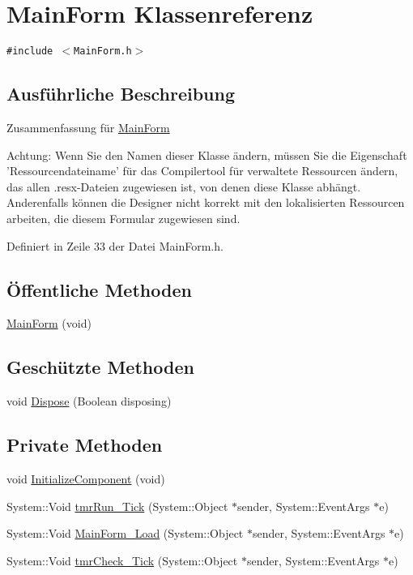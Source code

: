 \hypertarget{classQbeNDI_1_1MainForm}{
\section{Main\-Form Klassenreferenz}
\label{classQbeNDI_1_1MainForm}
}
{\tt \#include $<$Main\-Form.h$>$}



\subsection{Ausf\"{u}hrliche Beschreibung}
Zusammenfassung f\"{u}r \hyperlink{classQbeNDI_1_1MainForm}{Main\-Form}

Achtung: Wenn Sie den Namen dieser Klasse \"{a}ndern, m\"{u}ssen Sie die Eigenschaft 'Ressourcendateiname' f\"{u}r das Compilertool f\"{u}r verwaltete Ressourcen \"{a}ndern, das allen .resx-Dateien zugewiesen ist, von denen diese Klasse abh\"{a}ngt. Anderenfalls k\"{o}nnen die Designer nicht korrekt mit den lokalisierten Ressourcen arbeiten, die diesem Formular zugewiesen sind.  



Definiert in Zeile 33 der Datei Main\-Form.h.\subsection*{\"{O}ffentliche Methoden}
\begin{CompactItemize}
\item 
\hyperlink{classQbeNDI_1_1MainForm_QbeNDI_1_1MainForma0}{Main\-Form} (void)
\end{CompactItemize}
\subsection*{Gesch\"{u}tzte Methoden}
\begin{CompactItemize}
\item 
void \hyperlink{classQbeNDI_1_1MainForm_QbeNDI_1_1MainFormb0}{Dispose} (Boolean disposing)
\end{CompactItemize}
\subsection*{Private Methoden}
\begin{CompactItemize}
\item 
void \hyperlink{classQbeNDI_1_1MainForm_QbeNDI_1_1MainFormd0}{Initialize\-Component} (void)
\item 
System::Void \hyperlink{classQbeNDI_1_1MainForm_QbeNDI_1_1MainFormd1}{tmr\-Run\_\-Tick} (System::Object $\ast$sender, System::Event\-Args $\ast$e)
\item 
System::Void \hyperlink{classQbeNDI_1_1MainForm_QbeNDI_1_1MainFormd2}{Main\-Form\_\-Load} (System::Object $\ast$sender, System::Event\-Args $\ast$e)
\item 
System::Void \hyperlink{classQbeNDI_1_1MainForm_QbeNDI_1_1MainFormd3}{tmr\-Check\_\-Tick} (System::Object $\ast$sender, System::Event\-Args $\ast$e)
\end{CompactItemize}

